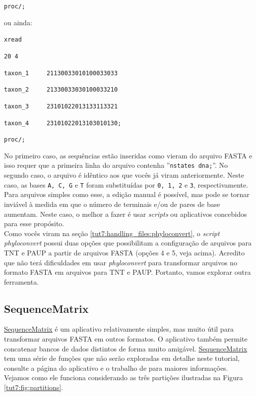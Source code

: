 \begin{refsection}
\noindent\texttt{proc/;}


\normalsize

ou ainda:\\

\scriptsize

\noindent\texttt{xread}

\noindent\texttt{20 4}


\noindent\texttt{taxon\_1~~~~~21130033010100033033}


\noindent\texttt{taxon\_2~~~~~21330033030100033210}


\noindent\texttt{taxon\_3~~~~~23101022013133113321}


\noindent\texttt{taxon\_4~~~~~23101022013103010130;}

\noindent\texttt{proc/;}\\


\normalsize

No primeiro caso, as sequências estão inseridas como vieram do arquivo FASTA e isso requer que a primeira linha do arquivo contenha ''\texttt{nstates dna;}''. No segundo caso, o arquivo é idêntico aos que vocês já viram anteriormente. Neste caso, as bases \texttt{A, C, G} e \texttt{T} foram substituídas por \texttt{0, 1, 2} e \texttt{3}, respectivamente. Para arquivos simples como esse, a edição manual é possível, mas pode se tornar inviável à medida em que o número de terminais e/ou de pares de base aumentam. Neste caso, o melhor a fazer é usar \textit{scripts} ou aplicativos concebidos para esse propósito.\\

Como vocês viram na seção \ref{tut7:handling_files:phyloconvert}, o \textit{script} \textit{phyloconvert} possui duas opções que possibilitam a configuração de arquivos para TNT e PAUP a partir de arquivos FASTA (opções 4 e 5, veja acima). Acredito que não terá dificuldades em usar \textit{phyloconvert} para transformar arquivos no formato FASTA em arquivos para TNT e PAUP. Portanto, vamos explorar outra ferramenta.\\

	\subsection{SequenceMatrix}\label{tut7:matrices:sequencematrix}

    \href{https://code.google.com/p/sequencematrix/}{SequenceMatrix}
	\parencite{Vaidya_et_all_2010} é um aplicativo relativamente simples, mas muito útil para transformar arquivos FASTA em outros formatos. O aplicativo também permite concatenar bancos de dados distintos de forma muito amigável. \href{https://code.google.com/p/sequencematrix/}{SequenceMatrix} tem uma série de funções que não serão exploradas em detalhe neste tutorial, consulte a página do aplicativo e o trabalho de \textcite{Vaidya_et_all_2010} para maiores informações. Vejamos como ele funciona considerando as três partições ilustradas na Figura \ref{tut7:fig:partitions}.


\end{refsection}
